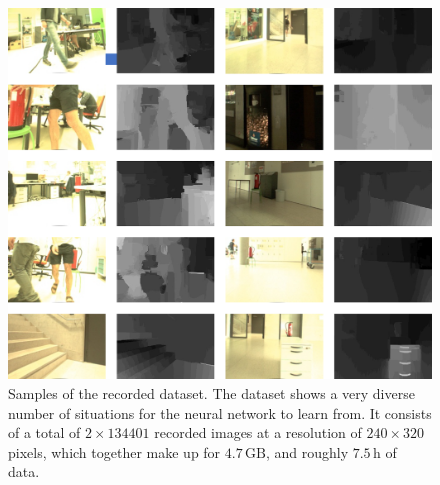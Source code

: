 \begin{figure}[h!]
	\centering
	\includegraphics[scale=.4]{chapters/11_autonomous_walking_experiments/img/dataset_diversity.png}
	\caption{Samples of the recorded dataset. The dataset shows a very diverse number of situations for the neural network to learn from. It consists of a total of $2\times134401$ recorded images at a resolution of $240\times320$ pixels, which together make up for $4.7\,\text{GB}$, and roughly $7.5\,\text{h}$ of data.}
	\label{fig::423_dataset}
\end{figure}
